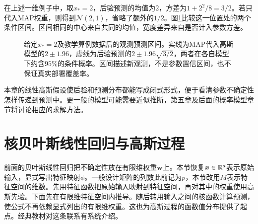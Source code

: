 在上述一维例子中，取$x_*=2$，后验预测的均值为$2$，方差为$1+2^2/8=3/2$。若只代入MAP权重，则得到$\mathcal N(2,1)$，省略了额外的$1/2$。图\ref{fig:linear-predictive-intervals}比较这一位置处的两个条件区间。区间相同的中心来自共同的均值，宽度差异来自是否计入参数方差。

\begin{figure}[htbp]
\centering
{}
\caption{给定$x_*=2$及教学算例数据后的观测预测区间。实线为MAP代入高斯模型的$2\pm1.96$，虚线为后验预测的$2\pm1.96\sqrt{3/2}$，两者在各自模型下约含$95\%$的条件概率。区间描述新观测，不是参数置信区间，也不保证真实部署覆盖率。}
\label{fig:linear-predictive-intervals}
\end{figure}

本章的线性高斯假设使后验和预测分布都能写成闭式形式，便于看清参数不确定性怎样传递到预测中。更一般的模型可能需要近似推断，第五章及后面的概率模型章节将讨论相应的求解方法。

\section{核贝叶斯线性回归与高斯过程}
\label{sec:gaussian-process-regression}
前面的贝叶斯线性回归把不确定性放在有限维权重$\bm w$上。本节恢复$\bm x\in\mathbb{R}^d$表示原始输入，显式写出特征映射$\phi$。一般设计矩阵的列数此前记为$p$，本节改用$M$表示特征空间的维数。先用特征函数把原始输入映射到特征空间，再对其中的权重使用高斯先验。下面先在有限维特征空间内推导。随后转用输入之间的核函数计算预测，使公式不再依赖显式列出的有限维权重。这也为高斯过程的函数值分布提供了起点。经典教材对这条联系有系统介绍\cite{rasmussen2006gpml}。

